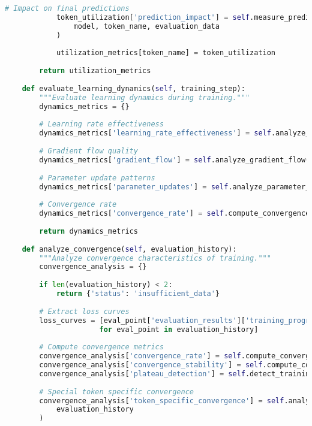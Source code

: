 \begin{lstlisting}[language=Python, caption=Comprehensive evaluation metrics framework for special token training]
            # Impact on final predictions
            token_utilization['prediction_impact'] = self.measure_prediction_impact(
                model, token_name, evaluation_data
            )
            
            utilization_metrics[token_name] = token_utilization
        
        return utilization_metrics
    
    def evaluate_learning_dynamics(self, training_step):
        """Evaluate learning dynamics during training."""
        dynamics_metrics = {}
        
        # Learning rate effectiveness
        dynamics_metrics['learning_rate_effectiveness'] = self.analyze_learning_rate_effectiveness()
        
        # Gradient flow quality
        dynamics_metrics['gradient_flow'] = self.analyze_gradient_flow()
        
        # Parameter update patterns
        dynamics_metrics['parameter_updates'] = self.analyze_parameter_update_patterns()
        
        # Convergence rate
        dynamics_metrics['convergence_rate'] = self.compute_convergence_rate(training_step)
        
        return dynamics_metrics
    
    def analyze_convergence(self, evaluation_history):
        """Analyze convergence characteristics of training."""
        convergence_analysis = {}
        
        if len(evaluation_history) < 2:
            return {'status': 'insufficient_data'}
        
        # Extract loss curves
        loss_curves = [eval_point['evaluation_results']['training_progress']['task_performance'].get('loss', 0) 
                      for eval_point in evaluation_history]
        
        # Compute convergence metrics
        convergence_analysis['convergence_rate'] = self.compute_convergence_rate_from_history(loss_curves)
        convergence_analysis['convergence_stability'] = self.compute_convergence_stability(loss_curves)
        convergence_analysis['plateau_detection'] = self.detect_training_plateaus(loss_curves)
        
        # Special token specific convergence
        convergence_analysis['token_specific_convergence'] = self.analyze_token_specific_convergence(
            evaluation_history
        )
        

\end{lstlisting}
